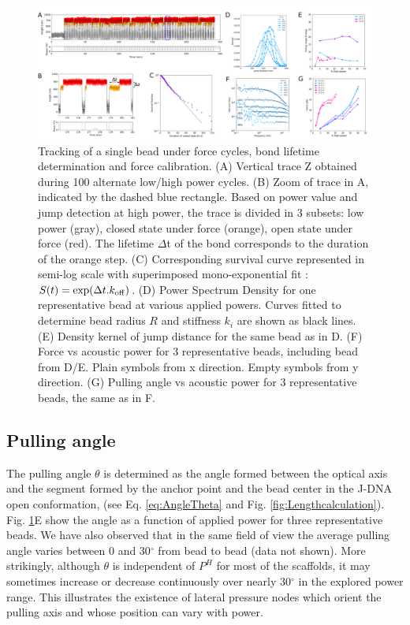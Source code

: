 \documentclass{biophys-new}
\begin{document}
\begin{figure}[hbt!]
	\centering
	\includegraphics[width=1\linewidth]{Figures/fig2.png}
	\caption{Tracking of a single bead under force cycles, bond lifetime determination and force calibration. (A) Vertical trace Z obtained during 100 alternate low/high power cycles. (B) Zoom of trace in A, indicated by the dashed blue rectangle. Based on power value and jump detection at high power, the trace is divided in 3 subsets: low power (gray), closed state under force (orange), open state under force (red). The lifetime $\Delta$t of the bond corresponds to the duration of the orange step. (C) Corresponding survival curve represented in semi-log scale with superimposed mono-exponential fit : $S(t) = \exp(\Delta t. k_{{\rm off}})$. (D) Power Spectrum Density for one representative bead at various applied powers. Curves fitted to determine bead radius $R$ and stiffness $k_i$ are shown as black lines. (E) Density kernel of jump distance for the same bead as in D. (F) Force vs acoustic power for 3 representative beads, including bead from D/E. Plain symbols from x direction. Empty symbols from y direction. (G) Pulling angle vs acoustic power for 3 representative beads, the same as in F.}
	\label{fig:lifetime}
\end{figure}


\subsection*{Pulling angle}

The pulling angle $\theta$ is determined as the angle formed between the optical axis and the segment formed by the anchor point and the bead center in the J-DNA open conformation, (see Eq. \ref{eq:AngleTheta} and Fig. \ref{fig:Lengthcalculation}). Fig. \ref{fig:lifetime}E show the angle as a function of applied power for three representative beads. 
We have also observed that in the same field of view the average pulling angle varies between 0 and 30$^{\circ}$ from bead to bead (data not shown). More strikingly, although $\theta$ is independent of $P^H$ for most of the scaffolds, it may sometimes increase or decrease continuously over nearly 30$^{\circ}$ in the explored power range. %
This illustrates the existence of lateral pressure nodes which orient the pulling axis and whose position can vary with power.
\end{document}
